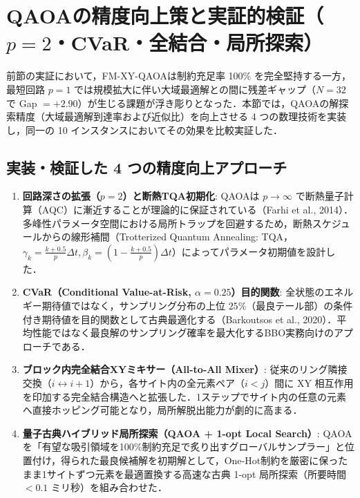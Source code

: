 \documentclass[11pt,a4paper]{ltjsarticle}
\begin{document}
\section{\texorpdfstring{QAOAの精度向上策と実証的検証（$p=2$・CVaR・全結合・局所探索）}{QAOAの精度向上策と実証的検証（p=2・CVaR・全結合・局所探索）}}
\label{sec:accuracy_enhancement}

前節の実証において，FM-XY-QAOAは制約充足率 100\% を完全堅持する一方，最短回路 $p=1$ では規模拡大に伴い大域最適解との間に残差ギャップ（$N=32$ で Gap $= +2.90$）が生じる課題が浮き彫りとなった．本節では，QAOAの解探索精度（大域最適解到達率および近似比）を向上させる 4 つの数理技術を実装し，同一の 10 インスタンスにおいてその効果を比較実証した．

\subsection{実装・検証した 4 つの精度向上アプローチ}
\begin{enumerate}\setlength{\itemsep}{1.5pt}
    \item \textbf{回路深さの拡張（$p=2$）と断熱TQA初期化}:
    QAOAは $p \to \infty$ で断熱量子計算（AQC）に漸近することが理論的に保証されている（Farhi et al., 2014）．多峰性パラメータ空間における局所トラップを回避するため，断熱スケジュールからの線形補間（Trotterized Quantum Annealing: TQA，$\gamma_k = \frac{k+0.5}{p} \Delta t, \beta_k = (1 - \frac{k+0.5}{p}) \Delta t$）によってパラメータ初期値を設計した．
    \item \textbf{CVaR（Conditional Value-at-Risk, $\alpha=0.25$）目的関数}:
    全状態のエネルギー期待値ではなく，サンプリング分布の上位 $25\%$（最良テール部）の条件付き期待値を目的関数として古典最適化する（Barkoutsos et al., 2020）．平均性能ではなく最良解のサンプリング確率を最大化するBBO実務向けのアプローチである．
    \item \textbf{ブロック内完全結合XYミキサー（All-to-All Mixer）}:
    従来のリング隣接交換（$i \leftrightarrow i+1$）から，各サイト内の全元素ペア（$i < j$）間に XY 相互作用を印加する完全結合構造へと拡張した．1ステップでサイト内の任意の元素へ直接ホッピング可能となり，局所解脱出能力が劇的に高まる．
    \item \textbf{量子古典ハイブリッド局所探索（QAOA + 1-opt Local Search）}:
    QAOAを「有望な吸引領域を100\%制約充足で炙り出すグローバルサンプラー」と位置付け，得られた最良候補解を初期解として，One-Hot制約を厳密に保ったまま1サイトずつ元素を最適置換する高速な古典 1-opt 局所探索（所要時間 $< 0.1$ ミリ秒）を組み合わせた．
\end{enumerate}
\end{document}

